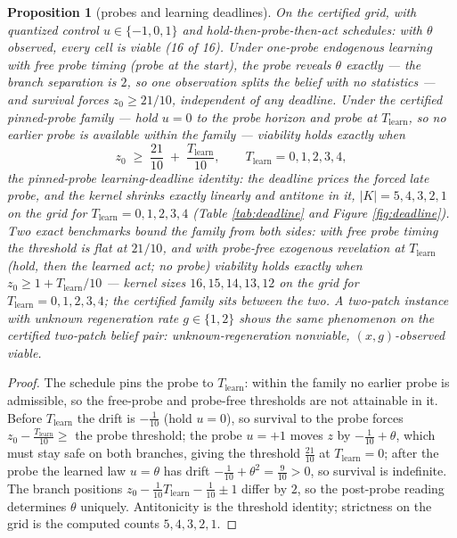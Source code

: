 \documentclass[10pt,twocolumn]{article}
\theoremstyle{plain}
\newtheorem{proposition}[theorem]{Proposition}
\theoremstyle{definition}
\theoremstyle{remark}
\begin{document}
\begin{proposition}[probes and learning deadlines]\label{prop:learn}
On the certified grid, with quantized control \(u \in \{-1, 0, 1\}\) and
hold-then-probe-then-act schedules: with \(\theta\) observed, every cell
is viable (16 of 16). Under one-probe endogenous learning with free probe timing (probe at
the start), the probe
reveals \(\theta\) exactly --- the branch separation is \(2\), so one
observation splits the belief with no statistics --- and survival forces
\(z_{0} \ge 21/10\), independent of any deadline. Under the certified
pinned-probe family --- hold \(u = 0\) to the probe horizon and probe
at \(T_{\mathrm{learn}}\), so no earlier probe is available within the
family --- viability holds exactly when
\[
z_{0} \;\ge\; \frac{21}{10} \;+\; \frac{T_{\mathrm{learn}}}{10},
\qquad T_{\mathrm{learn}} = 0, 1, 2, 3, 4,
\]
the pinned-probe learning-deadline identity: the deadline prices the
forced late probe, and the kernel shrinks exactly
linearly and antitone in it, \(|K| = 5, 4, 3, 2, 1\) on the grid for
\(T_{\mathrm{learn}} = 0, 1, 2, 3, 4\) (Table \ref{tab:deadline} and
Figure \ref{fig:deadline}). Two exact benchmarks bound the family from
both sides: with free probe timing the threshold is flat at
\(21/10\), and with probe-free exogenous revelation at
\(T_{\mathrm{learn}}\) (hold, then the learned act; no probe)
viability holds exactly when \(z_{0} \ge 1 + T_{\mathrm{learn}}/10\)
--- kernel sizes \(16, 15, 14, 13, 12\) on the grid for
\(T_{\mathrm{learn}} = 0, 1, 2, 3, 4\); the certified family sits
between the two. A two-patch instance with unknown
regeneration rate \(g \in \{1, 2\}\) shows the same phenomenon on the
certified two-patch belief pair: unknown-regeneration nonviable,
\((x, g)\)-observed viable.
\end{proposition}

\begin{proof}
The schedule pins the probe to \(T_{\mathrm{learn}}\): within the
family no earlier probe is admissible, so the free-probe and probe-free
thresholds are not attainable in it. Before \(T_{\mathrm{learn}}\) the
drift is \(-\tfrac{1}{10}\) (hold
\(u=0\)), so survival to the probe forces
\(z_{0}-\tfrac{T_{\mathrm{learn}}}{10}\ge\) the probe threshold; the
probe \(u=+1\) moves \(z\) by \(-\tfrac{1}{10}+\theta\), which must stay
safe on both branches, giving the threshold \(\tfrac{21}{10}\) at
\(T_{\mathrm{learn}}=0\); after the probe the learned law \(u=\theta\)
has drift \(-\tfrac{1}{10}+\theta^2=\tfrac{9}{10}>0\), so survival is
indefinite. The branch positions
\(z_{0}-\tfrac{1}{10}T_{\mathrm{learn}}-\tfrac{1}{10}\pm1\) differ by
\(2\), so the post-probe reading determines \(\theta\) uniquely.
Antitonicity is the threshold identity; strictness on the grid is the
computed counts \(5,4,3,2,1\).
\end{proof}
\end{document}

